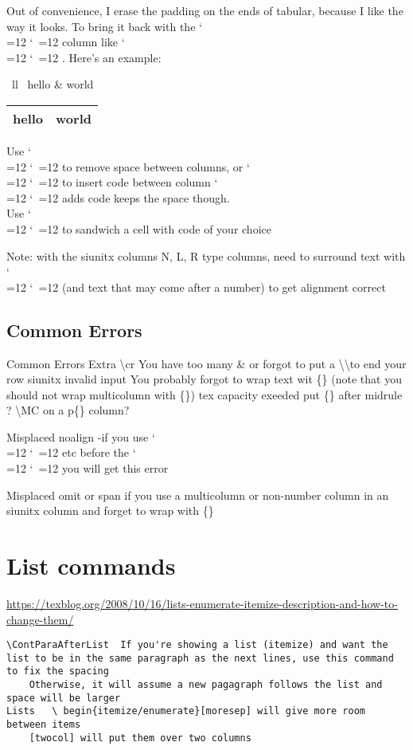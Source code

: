\documentclass{\FormatDir corpboreportMulti}
\def\cmd{\bgroup\catcode`\\=12 \catcode`\ =12 \cmdA}
\def\cmdA#1{\egroup{\texttt{\detokenize{#1}}}}
\begin{document}
Out of convenience, I erase the padding on the ends of tabular, because I like the way it looks.
To bring it back with the \cmd{~} column like  \cmd{~lllr~}. Here's an example:

\begin{LTXexample}
\begin{tabular}{~ll~}\toprule
hello & world \\
\bottomrule
\end{tabular}

\begin{tabular}{ll}\toprule
hello & world \\
\bottomrule
\end{tabular}
\end{LTXexample}


Use \cmd{@{}} to remove space between columns, or \cmd{@{'code'}} to insert code between column
\cmd{!{code}} adds code keeps the space though.\\
Use \cmd{>{'code'} <{'code'}} to sandwich a cell with code of your choice

Note: with the siunitx columns N, L, R type columns, need to surround text with \cmd{{}} (and text that may come after a number) to get alignment correct

	


\subsection{Common Errors}
Common Errors
	Extra \textbackslash cr	You have too many \& or forgot to put a \textbackslash\textbackslash to end your row
	siunitx invalid input	You probably forgot to wrap text wit \{\}  (note that you should not wrap multicolumn with \{\})
	tex capacity exeeded	put \{\} after midrule ?
	\textbackslash MC on a p\{\} column?

Misplaced noalign -if you use \cmd{\midrule} etc before the \cmd{\\} you will get this error

Misplaced omit or span if you use a multicolumn or non-number column in an siunitx column and
forget to wrap with \{\}

\section{List commands}
\url{https://texblog.org/2008/10/16/lists-enumerate-itemize-description-and-how-to-change-them/}

\begin{lstlisting}
\ContParaAfterList	If you're showing a list (itemize) and want the list to be in the same paragraph as the next lines, use this command to fix the spacing
	Otherwise, it will assume a new pagagraph follows the list and space will be larger
Lists	\ begin{itemize/enumerate}[moresep] will give more room between items
	[twocol] will put them over two columns

\end{lstlisting}
\end{document}
